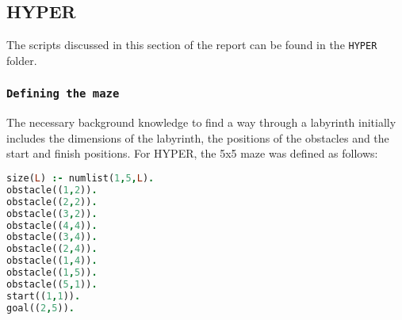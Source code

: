 \subsection{HYPER}\label{sec:hyper}
The scripts discussed in this section of the report can be found in the \texttt{HYPER} folder.\\

\subsubsection{\texttt{Defining the maze}}

The necessary background knowledge to find a way through a labyrinth initially includes the dimensions of the labyrinth, the positions of the obstacles and the start and finish positions. For HYPER, the 5x5 maze was defined as follows:
\begin{lstlisting}[label={lst:maze}, language=Prolog, caption=Definition of the maze, belowcaptionskip=1cm]
size(L) :- numlist(1,5,L).
obstacle((1,2)).
obstacle((2,2)).
obstacle((3,2)).
obstacle((4,4)).
obstacle((3,4)).
obstacle((2,4)).
obstacle((1,4)).
obstacle((1,5)).
obstacle((5,1)).
start((1,1)).
goal((2,5)).
\end{lstlisting}
